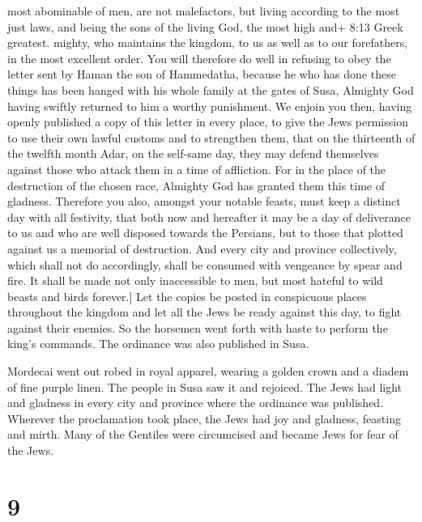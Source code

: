 most abominable of men, are not malefactors, but living according to the
most just laws, and being the sons of the living God, the most high and+
8:13 Greek greatest. mighty, who maintains the kingdom, to us as well as
to our forefathers, in the most excellent order. You will therefore do
well in refusing to obey the letter sent by Haman the son of Hammedatha,
because he who has done these things has been hanged with his whole
family at the gates of Susa, Almighty God having swiftly returned to him
a worthy punishment. We enjoin you then, having openly published a copy
of this letter in every place, to give the Jews permission to use their
own lawful customs and to strengthen them, that on the thirteenth of the
twelfth month Adar, on the self-same day, they may defend themselves
against those who attack them in a time of affliction. For in the place
of the destruction of the chosen race, Almighty God has granted them
this time of gladness. Therefore you also, amongst your notable feasts,
must keep a distinct day with all festivity, that both now and hereafter
it may be a day of deliverance to us and who are well disposed towards
the Persians, but to those that plotted against us a memorial of
destruction. And every city and province collectively, which shall not
do accordingly, shall be consumed with vengeance by spear and fire. It
shall be made not only inaccessible to men, but most hateful to wild
beasts and birds forever.{]} Let the copies be posted in conspicuous
places throughout the kingdom and let all the Jews be ready against this
day, to fight against their enemies.  So the horsemen went
forth with haste to perform the king's commands. The ordinance was also
published in Susa.

 Mordecai went out robed in royal apparel, wearing a golden
crown and a diadem of fine purple linen. The people in Susa saw it and
rejoiced.  The Jews had light and gladness  in
every city and province where the ordinance was published. Wherever the
proclamation took place, the Jews had joy and gladness, feasting and
mirth. Many of the Gentiles were circumcised and became Jews for fear of
the Jews.

\hypertarget{section-8}{%
\section{9}\label{section-8}}

